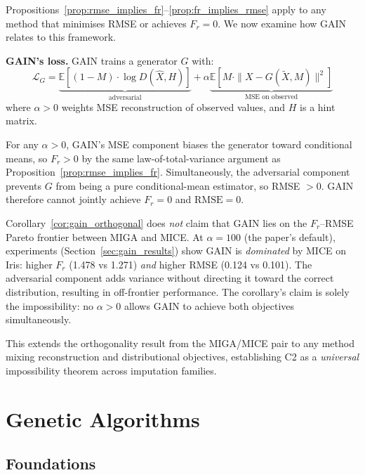 Propositions~\ref{prop:rmse_implies_fr}--\ref{prop:fr_implies_rmse} apply to any method that minimises RMSE or achieves $F_r=0$. We now examine how GAIN \cite{Yoon2018} relates to this framework.

\textbf{GAIN's loss.} GAIN trains a generator $G$ with:
\begin{equation}
    \mathcal{L}_G = \underbrace{\mathbb{E}[(1-M)\cdot\log D(\hat{X}, H)]}_{\text{adversarial}} + \alpha\underbrace{\mathbb{E}[M \cdot \|X - G(\tilde{X}, M)\|^2]}_{\text{MSE on observed}}
\end{equation}
where $\alpha > 0$ weights MSE reconstruction of observed values, and $H$ is a hint matrix.

\begin{corollary}[GAIN cannot achieve $F_r = 0$ and $\mathrm{RMSE} = 0$ simultaneously]
\label{cor:gain_orthogonal}
For any $\alpha > 0$, GAIN's MSE component biases the generator toward conditional means, so $F_r > 0$ by the same law-of-total-variance argument as Proposition~\ref{prop:rmse_implies_fr}. Simultaneously, the adversarial component prevents $G$ from being a pure conditional-mean estimator, so RMSE $> 0$. GAIN therefore cannot jointly achieve $F_r = 0$ and $\mathrm{RMSE} = 0$.
\end{corollary}

\begin{remark}
Corollary~\ref{cor:gain_orthogonal} does \emph{not} claim that GAIN lies on the $F_r$--RMSE Pareto frontier between MIGA and MICE. At $\alpha = 100$ (the paper's default), experiments (Section~\ref{sec:gain_results}) show GAIN is \emph{dominated} by MICE on Iris: higher $F_r$ (1.478 vs 1.271) \emph{and} higher RMSE (0.124 vs 0.101). The adversarial component adds variance without directing it toward the correct distribution, resulting in off-frontier performance. The corollary's claim is solely the impossibility: no $\alpha > 0$ allows GAIN to achieve both objectives simultaneously.
\end{remark}

This extends the orthogonality result from the MIGA/MICE pair to any method mixing reconstruction and distributional objectives, establishing C2 as a \emph{universal} impossibility theorem across imputation families.

\section{Genetic Algorithms}

\subsection{Foundations}

